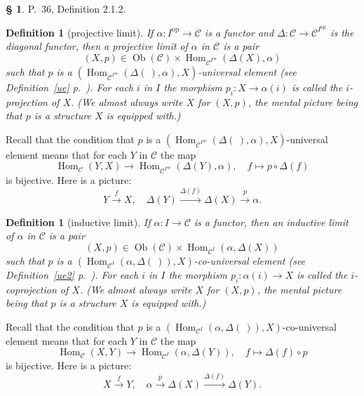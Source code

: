 \documentclass[12pt]{article}
\newtheorem{df}[thm]{Definition}
\theoremstyle{remark}
\theoremstyle{definition}
\newtheorem{s}[thm]{\S}
\newcommand{\C}{\mathcal C}
\newcommand{\xr}{\xrightarrow}
\DeclareMathOperator{\Hom}{Hom}
\DeclareMathOperator{\Ob}{Ob}
\DeclareMathOperator{\op}{op}
\begin{document}
\begin{s}\label{212}
P.~36, Definition 2.1.2. 

\begin{df}[projective limit]\label{p}
If $\alpha:I^{\op}\to\C$ is a functor and $\Delta:\C\to\C^{I^{\op}}$ is the diagonal functor, then a {\em projective limit of} $\alpha$ {\em in} $\C$ is a pair 
$$
(X,p)\in\Ob(\C)\times\Hom_{\C^{I^{\op}}}(\Delta(X),\alpha)
$$
such that $p$ is a $(\Hom_{\C^{I^{\op}}}(\Delta(\ ),\alpha),X)$\--universal element (see Definition~\ref{ue} p.~\pageref{ue}). For each $i$ in $I$ the morphism $p_i:X\to\alpha(i)$ is called the $i$-{\em projection} of $X$. (We almost always write $X$ for $(X,p)$, the mental picture being that $p$ is a structure $X$ is equipped with.)
\end{df}

Recall that the condition that $p$ is a $(\Hom_{\C^{I^{\op}}}(\Delta(\ ),\alpha),X)$\--universal element means that for each $Y$ in $\C$ the map 
$$
\Hom_\C(Y,X)\to\Hom_{\C^{I^{\op}}}(\Delta(Y),\alpha),\quad f\mapsto p\circ\Delta(f)
$$ 
is bijective. Here is a picture:
$$
Y\xr fX,\quad\Delta(Y)\xr{\Delta(f)}\Delta(X)\xr{p}\alpha.
$$

\begin{df}[inductive limit] 
If $\alpha:I\to\C$ is a functor, then an {\em inductive limit} of $\alpha$ {\em in} $\C$ is a pair 
$$
(X,p)\in\Ob(\C)\times\Hom_{\C^I}(\alpha,\Delta(X))
$$
such that $p$ is a $(\Hom_{\C^I}(\alpha,\Delta(\ )),X)$\--co-universal element (see Definition~\ref{ue2} p.~\pageref{ue2}). For each $i$ in $I$ the morphism $p_i:\alpha(i)\to X$ is called the $i$-{\em coprojection} of $X$. (We almost always write $X$ for $(X,p)$, the mental picture being that $p$ is a structure $X$ is equipped with.)
\end{df}

Recall that the condition that $p$ is a $(\Hom_{\C^I}(\alpha,\Delta(\ )),X)$\--co-universal element means that for each $Y$ in $\C$ the map 
\begin{equation}\label{cue}
\Hom_\C(X,Y)\to\Hom_{\C^I}(\alpha,\Delta(Y)),\quad f\mapsto\Delta(f)\circ p
\end{equation}
is bijective. Here is a picture:
$$
X\xr fY,\quad\alpha\xr{p}\Delta(X)\xr{\Delta(f)}\Delta(Y).
$$
\end{s}

%
\end{document}
